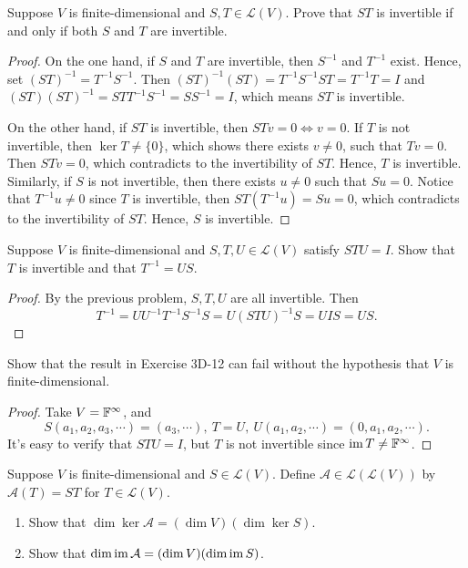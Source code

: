 \documentclass{article}
\begin{document}
\begin{problem}[3D-11]
    Suppose \( V \) is finite-dimensional and \( S,T\in\mathcal{L}(V) \). Prove that
    \( ST \) is invertible if and only if both \( S \) and \( T \) are invertible.
\end{problem}

\begin{proof}
    On the one hand, if \( S \) and \( T \) are invertible, then \( S^{-1} \) and \( T^{-1} \) exist. Hence, set \( (ST)^{-1}=T^{-1}S^{-1} \). Then \( (ST)^{-1}(ST)=T^{-1}S^{-1}ST=T^{-1}T=I \) and \( (ST)(ST)^{-1}=STT^{-1}S^{-1}=SS^{-1}=I \), which means \( ST \) is invertible. \par
    On the other hand, if \( ST \) is invertible, then \( STv=0\iff v=0 \). If \( T \) is not invertible, then \( \ker T\neq\{0\} \), which shows there exists \( v\neq 0 \), such that \( Tv=0 \). Then \( STv=0 \), which contradicts to the invertibility of \( ST \). Hence, \( T \) is invertible. Similarly, if \( S \) is not invertible, then there exists \( u\neq 0 \) such that \( Su=0 \). Notice that \( T^{-1}u\neq 0 \) since \( T  \) is invertible, then \( ST(T^{-1}u)=Su=0 \), which contradicts to the invertibility of \( ST \). Hence, \( S \) is invertible.
\end{proof}

\begin{problem}[3D-12]
    Suppose \( V \) is finite-dimensional and \( S,T,U\in\mathcal{L}(V) \) satisfy \( STU=I \). Show that \( T \) is invertible and that \( T^{-1}=US \).
\end{problem}

\begin{proof}
    By the previous problem, \( S,T,U \) are all invertible. Then
    \[ T^{-1}=UU^{-1}T^{-1}S^{-1}S=U(STU)^{-1}S=UIS=US. \] 
\end{proof}

\begin{problem}[3D-13]
    Show that the result in Exercise 3D-12 can fail without the hypothesis that \( V \) is finite-dimensional.
\end{problem}

\begin{proof}
    Take \( V=\mathbb{F}^\infty \), and 
    \[ S(a_1,a_2,a_3,\cdots)=(a_3,\cdots),\ T=U,\ U(a_1,a_2,\cdots) =(0,a_1,a_2,\cdots). \]
    It's easy to verify that \( STU=I \), but \( T \) is not invertible since \( \operatorname{im} T\neq\mathbb{F}^\infty \). 
\end{proof}

\begin{problem}[3D-17]
    Suppose \( V \) is finite-dimensional and \( S\in\mathcal{L}(V) \). Define \( \mathcal{A}\in\mathcal{L}(\mathcal{L}(V)) \) by
    \( \mathcal{A}(T)=ST \) for \( T\in\mathcal{L}(V) \).
    \begin{enumerate}[label=\textup{(\alph*)}]
        \item Show that \( \dim\ker\mathcal{A}=(\dim V)(\dim\ker S) \).
        \item Show that \( \dim\operatorname{im}\mathcal{A}=(\dim V)(\dim\operatorname{im} S) \).
    \end{enumerate}
\end{problem}
\end{document}
